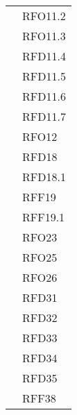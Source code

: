 \begin{longtable}{|>{\centering}m{10cm}|m{3cm}<{\centering}|}
& RFO11.2\\
& RFO11.3\\
& RFD11.4\\
& RFD11.5\\
& RFD11.6\\
& RFD11.7\\
& RFO12\\
& RFD18\\
& RFD18.1\\
& RFF19\\
& RFF19.1\\
& RFO23\\
& RFO25\\
& RFO26\\
& RFD31\\
& RFD32\\
& RFD33\\
& RFD34\\
& RFD35\\
& RFF38\\ \hline


\end{longtable}
